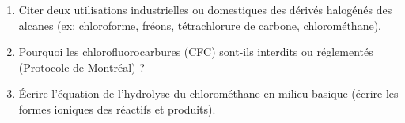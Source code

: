 \documentclass[11pt]{article}
\begin{document}
\begin{exercice}
\begin{enumerate}
    \item Citer deux utilisations industrielles ou domestiques des dérivés halogénés des alcanes (ex: chloroforme, fréons, tétrachlorure de carbone, chlorométhane).
    \item Pourquoi les chlorofluorocarbures (CFC) sont-ils interdits ou réglementés (Protocole de Montréal) ?
    \item Écrire l'équation de l'hydrolyse du chlorométhane  en milieu basique (écrire les formes ioniques des réactifs et produits).
\end{enumerate}
\end{exercice}
\end{document}
